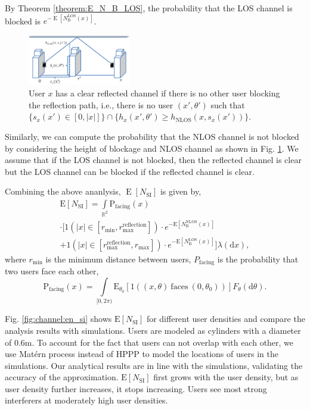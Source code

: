 \documentclass[10pt, conference, letterpaper]{IEEEtran}
\newcommand*{\Rom}[1]{\uppercase\expandafter{\romannumeral #1\relax}} %
\DeclareMathOperator*{\E}{\mathrm{E}}
\begin{document}
By Theorem \ref{theorem:E_N_B_LOS}, the probability that the LOS channel is blocked is $e^{-\E[N_\mathrm{B}^\mathrm{LOS}(x)]}$. 

\begin{figure}
	\centering
	\includegraphics[width = 0.4\textwidth]{Channel_NLOS.pdf}
	\caption{User $x$ has a clear reflected channel if there is no other user blocking the reflection path, i.e., there is no user $(x',\theta')$ such that $\{s_x(x')\in [0, |x|]\}\cap\{ h_x(x', \theta') \geq h_{\mathrm{NLOS}}(x, s_x(x'))\}$.}
	\label{fig:NLOS}
\end{figure}

Similarly, we can compute the probability that the NLOS channel is not blocked by considering the height of blockage and NLOS channel as shown in Fig. \ref{fig:NLOS}. We assume that if the LOS channel is not blocked, then the reflected channel is clear but the LOS channel can be blocked if the reflected channel is clear. 

Combining the above ananlysis, $\E[N_{\mathrm{SI}}]$ is given by,
\begin{multline}\label{eq:E_N_SI}
\mathrm{E}[N_{\mathrm{SI}}] =  \int\limits_{\mathbb{R}^2}
\mathrm{P}_{\text{facing}}(x)\\
\cdot \big[\text{1}(|x|\in[r_{\min},r_{\text{max}}^{\mathrm{reflection}}])
\cdot e^{-\mathrm{E}[N_{\mathrm{B}}^\mathrm{NLOS}(x)]} \\
+ \text{1}(|x|\in[r_{\text{max}}^{\mathrm{reflection}},r_{\text{max}}])
\cdot e^{-\mathrm{E}[N_{\mathrm{B}}^\mathrm{LOS}(x)]} \big]\lambda(\mathrm{d}x),
\end{multline}
where $r_{\min}$ is the minimum distance between users, $P_{\text{facing}}$ is the probability that two users face each other,
\begin{equation*}
\mathrm{P}_{\text{facing}}(x) = \int\limits_{[0,2\pi)}\mathrm{E}_{\theta_0}[\text{1}((x,\theta)\mathrm{~faces~}(0,\theta_0))]F_{\theta}(\mathrm{d}\theta).
\end{equation*}

Fig. \ref{fig:channel:en_si} shows $\mathrm{E}[N_{\mathrm{SI}}]$ for different user densities and compare the analysis results with simulations. 
Users are modeled as cylinders with a diameter of 0.6m. 
To account for the fact that users can not overlap with each other, we use Mat\'ern \Rom{3} process \cite{matern} instead of HPPP to model the locations of users in the simulations.
Our analytical results are in line with the simulations, validating the accuracy of the approximation. 
$\mathrm{E}[N_{\mathrm{SI}}]$ first grows with the user density, but as user density further increases, it stops increasing.
Users see most strong interferers at moderately high user densities. 
\end{document}
